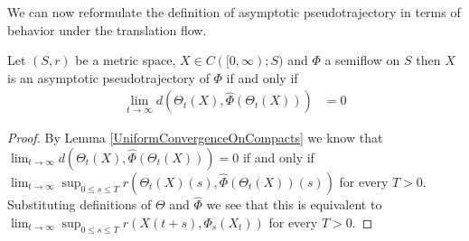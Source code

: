 We can now reformulate the definition of asymptotic pseudotrajectory in terms of behavior under the translation flow.
\begin{lem}Let $(S,r)$ be a metric space, $X \in C([0,\infty); S)$ and $\Phi$ a semiflow on $S$ then $X$ is an asymptotic pseudotrajectory of $\Phi$ if and only if
\begin{align*}
\lim_{t \to \infty} d(\Theta_t(X), \hat{\Phi}(\Theta_t(X))) &= 0
\end{align*}
\end{lem}
\begin{proof}
By Lemma \ref{UniformConvergenceOnCompacts} we know that $\lim_{t \to \infty} d(\Theta_t(X), \hat{\Phi}(\Theta_t(X))) = 0$ if and only if $\lim_{t \to \infty} \sup_{0 \leq s \leq T} r(\Theta_t(X)(s), \hat{\Phi}(\Theta_t(X))(s)) $ for every $T>0$.  Substituting definitions of $\Theta$ and $\hat{\Phi}$ we see that this is equivalent to
$\lim_{t \to \infty} \sup_{0 \leq s \leq T} r(X(t+s), \Phi_s(X_t)) $ for every $T>0$.  
\end{proof}

